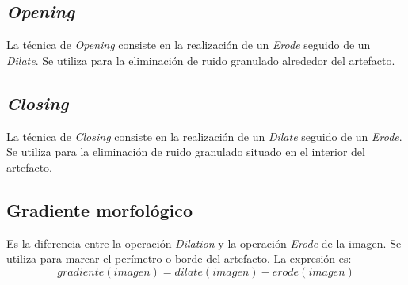 \subsection{\emph{Opening}}
La técnica de \emph{Opening} consiste en la realización de un
\emph{Erode} seguido de un \emph{Dilate}. Se utiliza para la
eliminación de ruido granulado alrededor del artefacto.

\subsection{\emph{Closing}}
La técnica de \emph{Closing} consiste en la realización de un
\emph{Dilate} seguido de un \emph{Erode}. Se utiliza para la
eliminación de ruido granulado situado en el interior del artefacto.

\subsection{Gradiente morfológico}
Es la diferencia entre la operación \emph{Dilation} y la operación
\emph{Erode} de la imagen. Se utiliza para marcar el perímetro o borde
del artefacto. La expresión es:
\begin{equation*}
  gradiente(imagen) = dilate(imagen) - erode(imagen)
\end{equation*}

